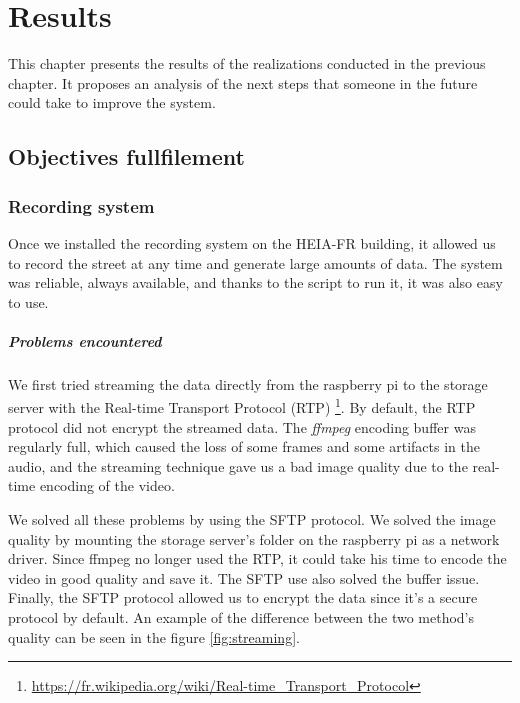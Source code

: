 \chapter{Results}
\label{ch:results}

This chapter presents the results of the realizations conducted in the previous chapter. It proposes an analysis of the next steps that someone in the future could take to improve the system.

\section{Objectives fullfilement}
\subsection{Recording system}

Once we installed the recording system on the HEIA-FR building, it allowed us to record the street at any time and generate large amounts of data. The system was reliable, always available, and thanks to the script to run it, it was also easy to use.

\paragraph*{Problems encountered}

We first tried streaming the data directly from the raspberry pi to the storage server with the Real-time Transport Protocol (RTP) \footnote{\url{https://fr.wikipedia.org/wiki/Real-time\_Transport\_Protocol}}. By default, the RTP protocol did not encrypt the streamed data. The \textit{ffmpeg} encoding buffer was regularly full, which caused the loss of some frames and some artifacts in the audio, and the streaming technique gave us a bad image quality due to the real-time encoding of the video.

We solved all these problems by using the SFTP protocol. We solved the image quality by mounting the storage server's folder on the raspberry pi as a network driver. Since ffmpeg no longer used the RTP, it could take his time to encode the video in good quality and save it. The SFTP use also solved the buffer issue. Finally, the SFTP protocol allowed us to encrypt the data since it's a secure protocol by default. An example of the difference between the two method's quality can be seen in the figure \ref{fig:streaming}.

